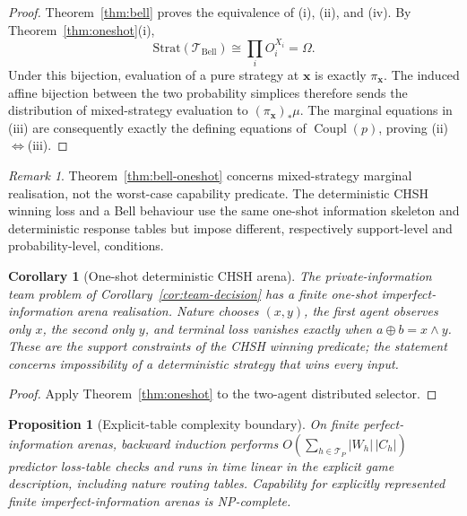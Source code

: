 \documentclass[11pt]{article}
\theoremstyle{plain}
\newtheorem{proposition}[theorem]{Proposition}
\newtheorem{corollary}[theorem]{Corollary}
\theoremstyle{definition}
\theoremstyle{remark}
\newtheorem{remark}[theorem]{Remark}
\begin{document}
\begin{proof}
Theorem~\ref{thm:bell} proves the equivalence of (i), (ii), and (iv). By
Theorem~\ref{thm:oneshot}(i),
\[
\mathrm{Strat}(\mathcal T_{\mathrm{Bell}})
\cong\prod_iO_i^{X_i}=\Omega.
\]
Under this bijection, evaluation of a pure strategy at $\mathbf x$ is exactly
$\pi_{\mathbf x}$. The induced affine bijection between the two probability
simplices therefore sends the distribution of mixed-strategy evaluation to
$(\pi_{\mathbf x})_*\mu$. The marginal equations in (iii) are consequently
exactly the defining equations of $\operatorname{Coupl}(p)$, proving
(ii)$\Leftrightarrow$(iii).
\end{proof}

\begin{remark}
Theorem~\ref{thm:bell-oneshot} concerns mixed-strategy marginal realisation, not
the worst-case capability predicate. The deterministic CHSH winning loss and a
Bell behaviour use the same one-shot information skeleton and deterministic
response tables but impose different, respectively support-level and
probability-level, conditions.
\end{remark}

\begin{corollary}[One-shot deterministic CHSH arena]\label{cor:chsh-arena}
The private-information team problem of Corollary~\ref{cor:team-decision} has a
finite one-shot imperfect-information arena realisation. Nature chooses
$(x,y)$, the first agent observes only $x$, the second only $y$, and terminal
loss vanishes exactly when $a\oplus b=x\wedge y$. These are the support
constraints of the CHSH winning predicate; the statement concerns impossibility
of a deterministic strategy that wins every input.
\end{corollary}

\begin{proof}
Apply Theorem~\ref{thm:oneshot} to the two-agent distributed selector.
\end{proof}

\begin{proposition}[Explicit-table complexity boundary]\label{prop:pnp}
On finite perfect-information arenas, backward induction performs
$O(\sum_{h\in\mathcal T_P}|W_h|\,|C_h|)$ predictor loss-table checks and runs in
time linear in the explicit game description, including nature routing tables.
Capability for explicitly represented finite imperfect-information arenas is
NP-complete.
\end{proposition}
\end{document}
